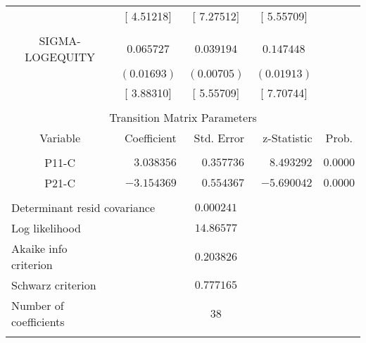 \begin{tabular}{lrrrr}
\multicolumn{1}{c}{}&\multicolumn{1}{c}{[ 4.51218]}&\multicolumn{1}{c}{[ 7.27512]}&\multicolumn{1}{c}{[ 5.55709]}&\multicolumn{1}{c}{}\\
\multicolumn{1}{c}{}&\multicolumn{1}{c}{}&\multicolumn{1}{c}{}&\multicolumn{1}{c}{}&\multicolumn{1}{c}{}\\
\multicolumn{1}{c}{SIGMA-LOGEQUITY}&\multicolumn{1}{c}{$0.065727$}&\multicolumn{1}{c}{$0.039194$}&\multicolumn{1}{c}{$0.147448$}&\multicolumn{1}{c}{}\\
\multicolumn{1}{c}{}&\multicolumn{1}{c}{$(0.01693)$}&\multicolumn{1}{c}{$(0.00705)$}&\multicolumn{1}{c}{$(0.01913)$}&\multicolumn{1}{c}{}\\
\multicolumn{1}{c}{}&\multicolumn{1}{c}{[ 3.88310]}&\multicolumn{1}{c}{[ 5.55709]}&\multicolumn{1}{c}{[ 7.70744]}&\multicolumn{1}{c}{}\\
[4.5pt] \hline \\ [-4.5pt]
\multicolumn{5}{c}{Transition Matrix Parameters}\\
\multicolumn{1}{c}{Variable}&\multicolumn{1}{r}{Coefficient}&\multicolumn{1}{r}{Std. Error}&\multicolumn{1}{r}{z-Statistic}&\multicolumn{1}{c}{Prob.}\\
[4.5pt] \hline \\ [-4.5pt]
\multicolumn{1}{c}{P11-C}&\multicolumn{1}{r}{$3.038356$}&\multicolumn{1}{r}{$0.357736$}&\multicolumn{1}{r}{$8.493292$}&\multicolumn{1}{c}{$0.0000$}\\
\multicolumn{1}{c}{P21-C}&\multicolumn{1}{r}{$-3.154369$}&\multicolumn{1}{r}{$0.554367$}&\multicolumn{1}{r}{$-5.690042$}&\multicolumn{1}{c}{$0.0000$}\\
[4.5pt] \hline \\ [-4.5pt]
\multicolumn{2}{l}{Determinant resid covariance}&\multicolumn{1}{c}{$0.000241$}&\multicolumn{1}{c}{}&\multicolumn{1}{c}{}\\
\multicolumn{1}{l}{Log likelihood}&\multicolumn{1}{c}{}&\multicolumn{1}{c}{$14.86577$}&\multicolumn{1}{c}{}&\multicolumn{1}{c}{}\\
\multicolumn{1}{l}{Akaike info criterion}&\multicolumn{1}{c}{}&\multicolumn{1}{c}{$0.203826$}&\multicolumn{1}{c}{}&\multicolumn{1}{c}{}\\
\multicolumn{1}{l}{Schwarz criterion}&\multicolumn{1}{c}{}&\multicolumn{1}{c}{$0.777165$}&\multicolumn{1}{c}{}&\multicolumn{1}{c}{}\\
\multicolumn{1}{l}{Number of coefficients}&\multicolumn{1}{c}{}&\multicolumn{1}{c}{$38$}&\multicolumn{1}{c}{}&\multicolumn{1}{c}{}\\
[4.5pt] \hline \\ [-4.5pt]
\end{tabular}